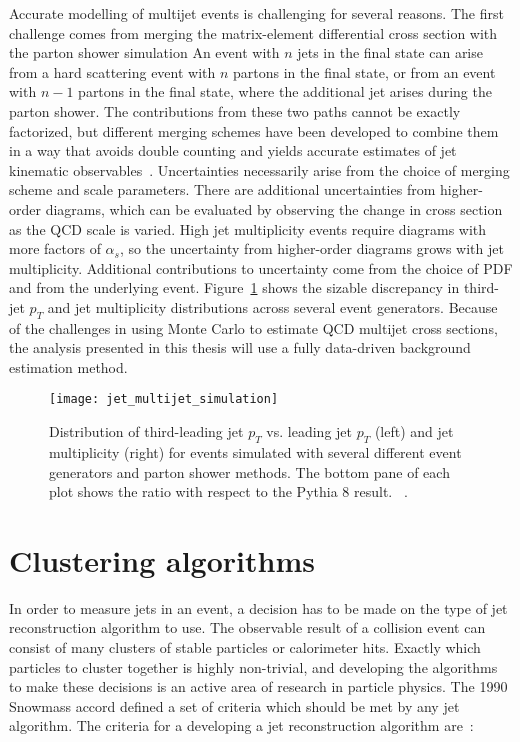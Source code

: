 Accurate modelling of multijet events is challenging for several reasons.
The first challenge comes from merging the matrix-element differential cross section with the parton shower simulation
An event with $n$ jets in the final state can arise from a hard scattering event with $n$ partons in the final state, or from an event with $n-1$ partons in the final state, where the additional jet arises during the parton shower.
The contributions from these two paths cannot be exactly factorized, but different merging schemes have been developed to combine them in a way that avoids double counting and yields accurate estimates of jet kinematic observables~\cite{jet-merging}.
Uncertainties necessarily arise from the choice of merging scheme and scale parameters.
There are additional uncertainties from higher-order diagrams, which can be evaluated by observing the change in cross section as the QCD scale is varied.
High jet multiplicity events require diagrams with more factors of $\alpha_{s}$, so the uncertainty from higher-order diagrams grows with jet multiplicity.
Additional contributions to uncertainty come from the choice of PDF and from the underlying event.
Figure~\ref{fig:jet_multijet_uncertainties} shows the sizable discrepancy in third-jet $p_{T}$ and jet multiplicity distributions across several event generators.
Because of the challenges in using Monte Carlo to estimate QCD multijet cross sections, the analysis presented in this thesis will use a fully data-driven background estimation method.
\begin{figure}[!ht]
    \centering
\texttt{[image: jet\_multijet\_simulation]}
\caption{Distribution of third-leading jet $p_{T}$ vs. leading jet $p_{T}$ (left) and jet multiplicity (right) for events simulated with several different event generators and parton shower methods.
The bottom pane of each plot shows the ratio with respect to the Pythia 8 result.
~\cite{jet-multijet-simulation}.}
\label{fig:jet_multijet_uncertainties}
\end{figure}

\section{Clustering algorithms}\label{sec:jet_clustering}

In order to measure jets in an event, a decision has to be made on the type of jet reconstruction algorithm to use.
The observable result of a collision event can consist of many clusters of stable particles or calorimeter hits.
Exactly which particles to cluster together is highly non-trivial, and developing the algorithms to make these decisions is an active area of research in particle physics.
The 1990 Snowmass accord defined a set of criteria which should be met by any jet algorithm.
The criteria for a developing a jet reconstruction algorithm are~\cite{jet-jetography,jet-snowmass}:

